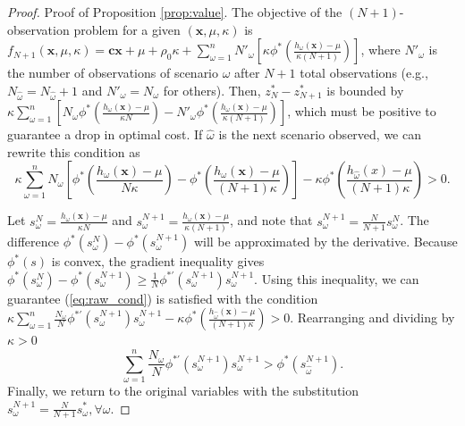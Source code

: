 \documentclass[opre,nonblindrev]{informs3} %
\newcommand{\x}{\mathbf{x}}
\renewcommand{\c}{\mathbf{c}}
\begin{document}
\begin{proof}{\sc Proof of Proposition \ref{prop:value}.}
	The objective of the $(N+1)$-observation problem for a given $(\x,\mu,\kappa)$ is $ f_{N+1}(\x,\mu,\kappa) = \c\x + \mu + \rho_0 \kappa + \sum_{\omega = 1}^n N'_\omega \left[ \kappa \phi^*\left(\frac{h_\omega(\x) - \mu}{\kappa (N+1)} \right) \right]$,	where $N'_\omega$ is the number of observations of scenario $\omega$ after $N+1$ total observations (e.g., $N_{\hat{\omega}}=N_{\hat{\omega}}+1$ and $N'_\omega = N_\omega$ for others).
	Then, $z_N^* - z_{N+1}^*$ is bounded by $\kappa \sum_{\omega=1}^n \left[ N_\omega \phi^*\left(\frac{h_\omega(\x) - \mu}{\kappa N} \right) - N'_\omega \phi^*\left(\frac{h_\omega(\x) - \mu}{\kappa (N+1)} \right) \right]$, which must be positive to guarantee a drop in optimal cost.
	If $\hat{\omega}$ is the next scenario observed, we can rewrite this condition as
	\begin{equation} \label{eq:raw_cond}
		\kappa \sum_{\omega=1}^n N_\omega \left[ \phi^*\left(\frac{h_\omega(\x) - \mu}{N\kappa} \right) - \phi^*\left(\frac{h_\omega(\x) - \mu}{(N+1)\kappa} \right) \right] - \kappa \phi^*\left(\frac{h_{\hat{\omega}}(x) - \mu}{(N+1)\kappa}\right) > 0.
	\end{equation}

	Let $s^N_\omega = \frac{h_\omega(\x) - \mu}{\kappa N}$ and $s^{N+1}_\omega = \frac{h_\omega(\x) - \mu}{\kappa (N+1)}$, and note that $s^{N+1}_\omega = \tfrac{N}{N+1} s^N_\omega$.
	The difference $\phi^*(s^N_\omega) - \phi^*(s^{N+1}_\omega)$ will be approximated by the derivative.
Because $\phi^*(s)$ is convex, the gradient inequality gives $\phi^*(s^N_\omega) - \phi^*(s^{N+1}_\omega) \geq \frac{1}{N} \phi^{*\prime}(s^{N+1}_\omega) s^{N+1}_\omega$. 
	Using this inequality, we can guarantee (\ref{eq:raw_cond}) is satisfied with the condition $\kappa \sum_{\omega=1}^n \frac{N_\omega}{N} \phi^{*\prime}(s^{N+1}_\omega) s^{N+1}_\omega - \kappa \phi^*\left(\frac{h_{\hat{\omega}}(\x) - \mu}{(N+1)\kappa}\right) > 0$.
	 Rearranging and dividing by $\kappa > 0$
	\begin{equation*} %
		\sum_{\omega=1}^n \frac{N_\omega}{N} \phi^{*\prime}(s^{N+1}_\omega) s^{N+1}_\omega > \phi^*(s^{N+1}_{\hat{\omega}}).
	\end{equation*}
	Finally, we return to the original variables with the substitution $s^{N+1}_\omega = \frac{N}{N+1} s^*_\omega, \forall \omega$. 
	\Halmos
\end{proof}
\end{document}
